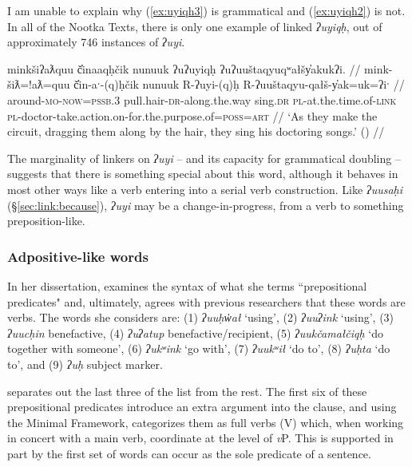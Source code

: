 I am unable to explain why (\ref{ex:uyiqh3}) is grammatical and (\ref{ex:uyiqh2}) is not. In all of the Nootka Texts, there is only one example of linked \textit{ʔuyiqḥ}, out of approximately 746 instances of \textit{ʔuyi}.

\ex \label{ex:uyiqh4}
\begingl
\glpreamble minkšiʔaƛquu č̓inaaqḥčik nunuuk ʔuʔuyiqḥ ʔuʔuuštaqyuqʷałšy̓akukʔi. //
\gla mink-šiƛ=!aƛ=quu č̓in-aˑ-(q)ḥčik nunuuk R-ʔuyi-(q)ḥ R-ʔuuštaqyu-qałš-y̓ak=uk=ʔiˑ //
\glb around-\textsc{mo}-\textsc{now}=\textsc{pssb.3} pull.hair-\textsc{dr}-along.the.way sing.\textsc{dr} \textsc{pl}-at.the.time.of-\textsc{link} \textsc{pl}-doctor-take.action.on-for.the.purpose.of=\textsc{poss}=\textsc{art} //
\glft `As they make the circuit, dragging them along by the hair, they sing his doctoring songs.' (\citealt[105]{sapir1939}) //
\endgl
\xe

The marginality of linkers on \textit{ʔuyi} -- and its capacity for grammatical doubling -- suggests that there is something special about this word, although it behaves in most other ways like a verb entering into a serial verb construction. Like \textit{ʔuusaḥi} (\S\ref{sec:link:because}), \textit{ʔuyi} may be a change-in-progress, from a verb to something preposition-like.

\subsubsection{Adpositive-like words} \label{sec:link:adpositive}

In her dissertation, \cite{woo2007b} examines the syntax of what she terms ``prepositional predicates" and, ultimately, agrees with previous researchers that these words are verbs. The words she considers are: (1) \textit{ʔuuḥw̓ał} `using', (2) \textit{ʔuuʔink} `using', (3) \textit{ʔuucḥin} benefactive, (4) \textit{ʔuʔatup} benefactive/recipient, (5) \textit{ʔuukčamałčiqḥ} `do together with someone', (6) \textit{ʔukʷink} `go with', (7) \textit{ʔuukʷił} `do to', (8) \textit{ʔuḥta} `do to', and (9) \textit{ʔuḥ} subject marker.

\citeauthor{woo2007b} separates out the last three of the list from the rest. The first six of these prepositional predicates introduce an extra argument into the clause, and using the Minimal Framework, \citeauthor{woo2007b} categorizes them as full verbs (V) which, when working in concert with a main verb, coordinate at the level of \textit{v}P. This is supported in part by the first set of words can occur as the sole predicate of a sentence.

